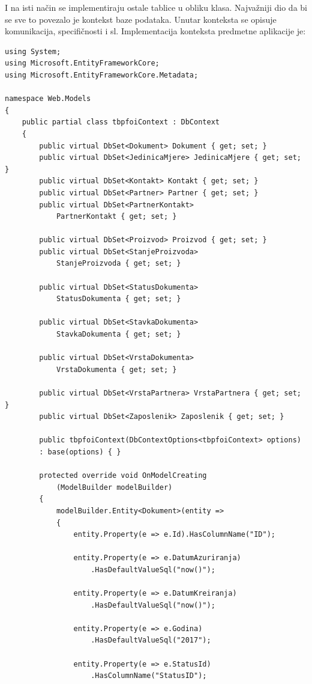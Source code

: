 \documentclass[a4paper,12pt]{foi}
\begin{document}
I na isti način se implementiraju ostale tablice u obliku klasa. Najvažniji dio da bi se sve to povezalo je kontekst baze podataka. Unutar konteksta se opisuje komunikacija, specifičnosti i sl. Implementacija konteksta predmetne aplikacije je:

\begin{lstlisting}[language={[Sharp]C}]
using System;
using Microsoft.EntityFrameworkCore;
using Microsoft.EntityFrameworkCore.Metadata;

namespace Web.Models
{
    public partial class tbpfoiContext : DbContext
    {
        public virtual DbSet<Dokument> Dokument { get; set; }
        public virtual DbSet<JedinicaMjere> JedinicaMjere { get; set; }
        public virtual DbSet<Kontakt> Kontakt { get; set; }
        public virtual DbSet<Partner> Partner { get; set; }
        public virtual DbSet<PartnerKontakt> 
        	PartnerKontakt { get; set; }
        	
        public virtual DbSet<Proizvod> Proizvod { get; set; }
        public virtual DbSet<StanjeProizvoda> 
        	StanjeProizvoda { get; set; }
        	
        public virtual DbSet<StatusDokumenta> 
        	StatusDokumenta { get; set; }
        	
        public virtual DbSet<StavkaDokumenta> 
        	StavkaDokumenta { get; set; }
        	
        public virtual DbSet<VrstaDokumenta> 
        	VrstaDokumenta { get; set; }
        	
        public virtual DbSet<VrstaPartnera> VrstaPartnera { get; set; }
        public virtual DbSet<Zaposlenik> Zaposlenik { get; set; }

        public tbpfoiContext(DbContextOptions<tbpfoiContext> options)
   		: base(options) { }

        protected override void OnModelCreating
        	(ModelBuilder modelBuilder)
        {
            modelBuilder.Entity<Dokument>(entity =>
            {
                entity.Property(e => e.Id).HasColumnName("ID");

                entity.Property(e => e.DatumAzuriranja)
                	.HasDefaultValueSql("now()");

                entity.Property(e => e.DatumKreiranja)
                	.HasDefaultValueSql("now()");

                entity.Property(e => e.Godina)
                	.HasDefaultValueSql("2017");

                entity.Property(e => e.StatusId)
                	.HasColumnName("StatusID");


\end{lstlisting}
\end{document}
